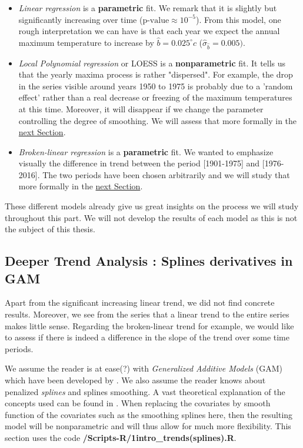 \begin{itemize}
\item \emph{Linear regression} is a \textbf{parametric} fit. We remark that it is slightly but significantly increasing over time ($\text{p-value}\approx 10^{-5}$). From this model, one rough interpretation we can have is that each year we expect the annual maximum temperature to increase by $\hat{b}=0.025^{\circ}c$ ($\hat{\sigma}_{\hat{b}}=0.005)$.

\item \emph{Local Polynomial regression } or LOESS is a \textbf{nonparametric} fit. It tells us that the yearly maxima process is rather "dispersed". For example, the drop in the series visible around years 1950 to 1975 is probably due to a 'random effect' rather than a real decrease or freezing of the maximum temperatures at this time. Moreover, it will disappear if we change the parameter controlling the degree of smoothing. We will assess that more formally in the \hyperref[sec:splines]{next Section}.

\item \emph{Broken-linear regression} is a \textbf{parametric} fit. We wanted to emphasize visually the difference in trend between the period [1901-1975] and [1976-2016]. The two periods have been chosen arbitrarily and we will study that more formally in the \hyperref[sec:splines]{next Section}.
\end{itemize}

These different models already give us great insights on the process we will study throughout this part. We will not develop the results of each model as this is not the subject of this thesis. 


\subsection{Deeper Trend Analysis : Splines derivatives in GAM}\label{sec:splines}

Apart from the significant increasing linear trend, we did not find concrete results. Moreover, we see from the series that a linear trend to the entire series makes little sense. Regarding the broken-linear trend for example, we would like to assess if there is indeed a difference in the slope of the trend over some time periods. 

We assume the reader is at ease(?) with\emph{ Generalized Additive Models} (GAM) which have been developed by \citet{hastie_generalized_1986}. We also assume the reader knows about penalized \emph{splines} and splines smoothing. A vast theoretical explanation of the concepts used can be found in \citet[chapter 3, 6 and 11]{ruppert_semiparametric_2003}. When replacing the covariates by smooth function of the covariates such as the smoothing splines here, then the resulting model will be nonparametric and will thus allow for much more flexibility.
 This section uses the code \textbf{/Scripts-R/1intro\_trends(splines).R}.


